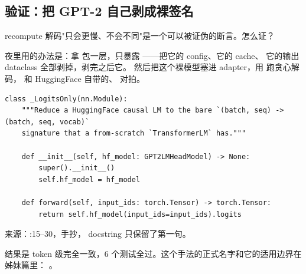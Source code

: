 \subsection{验证：把 GPT-2 自己剥成裸签名}
\label{sec:b-kv-stub}

recompute 解码"只会更慢、不会不同"是一个可以被证伪的断言。怎么证？

夜里用的办法是：拿  包一层，只暴露
——把它的 config、它的 cache、
它的输出 dataclass 全部剥掉，剥完之后它。
然后把这个裸模型塞进 adapter，用  跑贪心解码，
和 HuggingFace 自带的、  对拍。

\begin{lstlisting}[style=hlplain]
class _LogitsOnly(nn.Module):
    """Reduce a HuggingFace causal LM to the bare `(batch, seq) -> (batch, seq, vocab)`
    signature that a from-scratch `TransformerLM` has."""

    def __init__(self, hf_model: GPT2LMHeadModel) -> None:
        super().__init__()
        self.hf_model = hf_model

    def forward(self, input_ids: torch.Tensor) -> torch.Tensor:
        return self.hf_model(input_ids=input_ids).logits
\end{lstlisting}
\noindent 来源：:15--30，手抄，
docstring 只保留了第一句。

结果是 token 级完全一致，6 个测试全过。这个手法的正式名字和它的适用边界在姊妹篇里：
。

